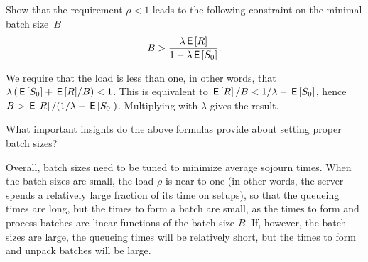 \begin{exercise}
Show that the requirement $\rho < 1$ leads to the following constraint on the minimal batch size~$B$ 
  \begin{equation*}
 B>\frac{\lambda \,\mathsf{E}\left[R\right]}{1-\lambda \,\mathsf{E}\left[S_0\right]}.
  \end{equation*}
  \begin{solution}
    We require that the load is less than one, in other words, that $\lambda\left(\,\mathsf{E}\left[S_0\right] + {\,\mathsf{E}\left[R\right]}/B\right) < 1$. This  is equivalent to $\,\mathsf{E}\left[R\right]/B < 1/\lambda - \,\mathsf{E}\left[S_0\right]$, hence $B > \,\mathsf{E}\left[R\right]/(1/\lambda - \,\mathsf{E}\left[S_0\right])$. Multiplying with $\lambda$ gives the result. 
  \end{solution}
\end{exercise}

\begin{exercise}
  What important insights do the above formulas provide about setting proper batch sizes?
  \begin{solution}
    Overall, batch sizes need to be tuned to minimize average sojourn times.
    When the batch sizes are small, the load $\rho$ is near to one (in other words, the server spends a relatively large fraction of its time on setups), so that the queueing times are long, but the times to form a batch are small, as the times to form and process batches are linear functions of the batch size $B$.
    If, however, the batch sizes are large, the queueing times will be relatively short, but the times to form and unpack batches will be large.
  \end{solution}
\end{exercise}



